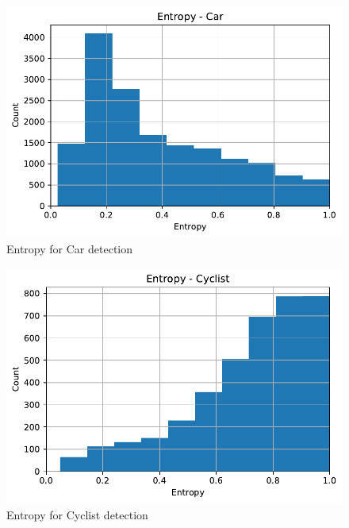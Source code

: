 \documentclass[10pt,twocolumn,letterpaper]{article}
\begin{document}
\begin{figure}[!htbp]
        \centering
		\includegraphics[scale = 0.4]{./images/Part-Bayesian F_Pointnet_Results/Entropy_Car.pdf}
        \caption[Extracted frustum point cloud after Normalization]{Entropy for Car detection}
        \label{fig:Norm Point Cloud}
\end{figure}
\begin{figure}[!htbp]
        \centering
		\includegraphics[scale = 0.4]{images/Part-Bayesian F_Pointnet_Results/Entropy_Cyclist.pdf}
        \caption[Extracted frustum point cloud after Normalization]{Entropy for Cyclist detection}
        \label{fig:Norm Point Cloud}
\end{figure}
\end{document}

